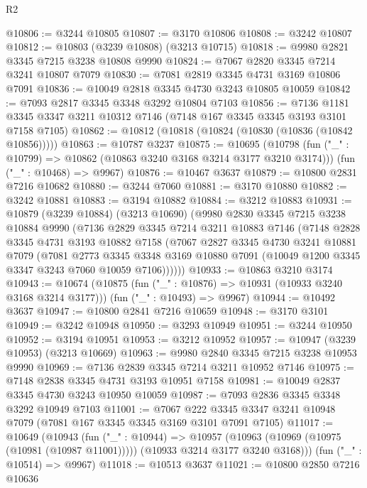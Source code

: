 \begin{lexlean}{R2}
\begin{coremodule}
@10806 := @3244 @10805
@10807 := @3170 @10806
@10808 := @3242 @10807
@10812 := @10803 (@3239 @10808) (@3213 @10715)
@10818 := @9980 @2821 @3345 @7215 @3238 @10808 @9990
@10824 := @7067 @2820 @3345 @7214 @3241 @10807 @7079
@10830 := @7081 @2819 @3345 @4731 @3169 @10806 @7091
@10836 := @10049 @2818 @3345 @4730 @3243 @10805 @10059
@10842 := @7093 @2817 @3345 @3348 @3292 @10804 @7103
@10856 := @7136
    @1181
    @3345
    @3347
    @3211
    @10312
    @7146
    (@7148 @167 @3345 @3345 @3193 @3101 @7158 @7105)
@10862 := @10812 (@10818 (@10824 (@10830 (@10836 (@10842 @10856)))))
@10863 := @10787 @3237
@10875 := @10695
    (@10798 (fun ("_" : @10799) => @10862 (@10863 @3240 @3168 @3214 @3177 @3210 @3174)))
    (fun ("_" : @10468) => @9967)
@10876 := @10467 @3637
@10879 := @10800 @2831 @7216 @10682
@10880 := @3244 @7060
@10881 := @3170 @10880
@10882 := @3242 @10881
@10883 := @3194 @10882
@10884 := @3212 @10883
@10931 := @10879
    (@3239 @10884)
    (@3213 @10690)
    (@9980
      @2830
      @3345
      @7215
      @3238
      @10884
      @9990
      (@7136
        @2829
        @3345
        @7214
        @3211
        @10883
        @7146
        (@7148
          @2828
          @3345
          @4731
          @3193
          @10882
          @7158
          (@7067
            @2827
            @3345
            @4730
            @3241
            @10881
            @7079
            (@7081
              @2773
              @3345
              @3348
              @3169
              @10880
              @7091
              (@10049 @1200 @3345 @3347 @3243 @7060 @10059 @7106))))))
@10933 := @10863 @3210 @3174
@10943 := @10674
    (@10875 (fun ("_" : @10876) => @10931 (@10933 @3240 @3168 @3214 @3177)))
    (fun ("_" : @10493) => @9967)
@10944 := @10492 @3637
@10947 := @10800 @2841 @7216 @10659
@10948 := @3170 @3101
@10949 := @3242 @10948
@10950 := @3293 @10949
@10951 := @3244 @10950
@10952 := @3194 @10951
@10953 := @3212 @10952
@10957 := @10947 (@3239 @10953) (@3213 @10669)
@10963 := @9980 @2840 @3345 @7215 @3238 @10953 @9990
@10969 := @7136 @2839 @3345 @7214 @3211 @10952 @7146
@10975 := @7148 @2838 @3345 @4731 @3193 @10951 @7158
@10981 := @10049 @2837 @3345 @4730 @3243 @10950 @10059
@10987 := @7093 @2836 @3345 @3348 @3292 @10949 @7103
@11001 := @7067 @222 @3345 @3347 @3241 @10948 @7079 (@7081 @167 @3345 @3345 @3169 @3101 @7091 @7105)
@11017 := @10649
    (@10943
      (fun ("_" : @10944) =>
      @10957 (@10963 (@10969 (@10975 (@10981 (@10987 @11001))))) (@10933 @3214 @3177 @3240 @3168)))
    (fun ("_" : @10514) => @9967)
@11018 := @10513 @3637
@11021 := @10800 @2850 @7216 @10636

\end{coremodule}
\end{lexlean}

